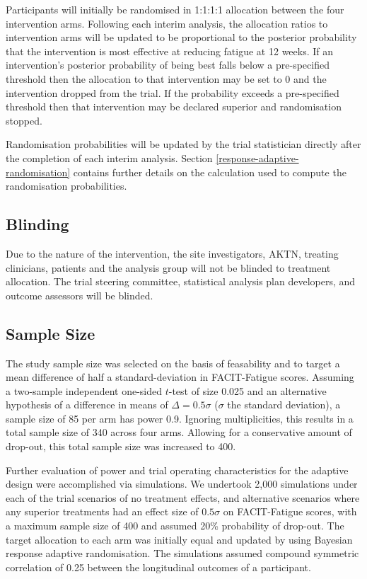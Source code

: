 \documentclass[
]{article}
\begin{document}
Participants will initially be randomised in 1:1:1:1 allocation between the four intervention arms.
Following each interim analysis, the allocation ratios to intervention arms will be updated to be proportional to the posterior probability that the intervention is most effective at reducing fatigue at 12 weeks.
If an intervention's posterior probability of being best falls below a pre-specified threshold then the allocation to that intervention may be set to 0 and the intervention dropped from the trial.
If the probability exceeds a pre-specified threshold then that intervention may be declared superior and randomisation stopped.

Randomisation probabilities will be updated by the trial statistician directly after the completion of each interim analysis.
Section \ref{response-adaptive-randomisation} contains further details on the calculation used to compute the randomisation probabilities.

\hypertarget{blinding}{%
  \subsection{Blinding}\label{blinding}}

  Due to the nature of the intervention, the site investigators, AKTN, treating clinicians, patients and the analysis group will not be blinded to treatment allocation. 
  The trial steering committee, statistical analysis plan developers, and outcome assessors will be blinded. 

\hypertarget{sample-size}{%
  \subsection{Sample Size}\label{sample-size}}

The study sample size was selected on the basis of feasability and to target a mean difference of half a standard-deviation in FACIT-Fatigue scores.
Assuming a two-sample independent one-sided $t$-test of size 0.025 and an alternative hypothesis of a difference in means of $\Delta=0.5\sigma$ ($\sigma$ the standard deviation), a sample size of 85 per arm has power 0.9.
Ignoring multiplicities, this results in a total sample size of 340 across four arms.
Allowing for a conservative amount of drop-out, this total sample size was increased to 400.

Further evaluation of power and trial operating characteristics for the adaptive design were accomplished via simulations.
We undertook 2,000 simulations under each of the trial scenarios of no treatment effects, and alternative scenarios where any superior treatments had an effect size of $0.5\sigma$ on FACIT-Fatigue scores, with a maximum sample size of 400 and assumed 20\% probability of drop-out.
The target allocation to each arm was initially equal and updated by using Bayesian response adaptive randomisation.
The simulations assumed compound symmetric correlation of 0.25 between the longitudinal outcomes of a participant.
\end{document}
